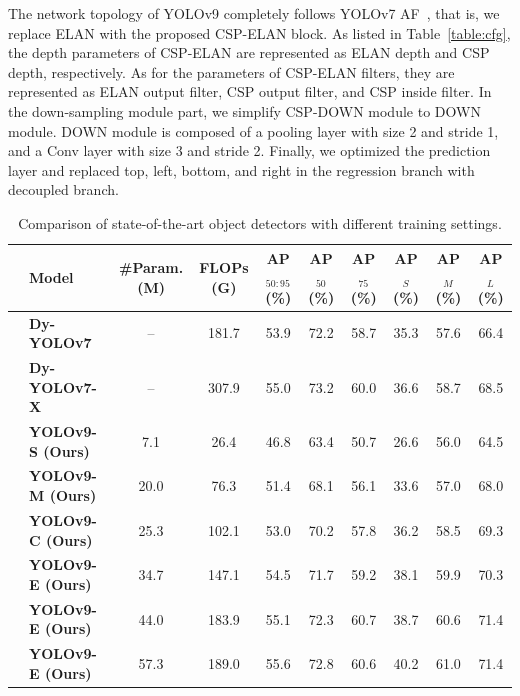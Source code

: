 \documentclass[10pt,twocolumn,letterpaper]{article}
\begin{document}
	The network topology of YOLOv9 completely follows YOLOv7 AF~\cite{wang2023yolov7}, that is, we replace ELAN with the proposed CSP-ELAN block.  As listed in Table~\ref{table:cfg}, the depth parameters of CSP-ELAN are represented as ELAN depth and CSP depth, respectively.  As for the parameters of CSP-ELAN filters, they are represented as ELAN output filter, CSP output filter, and CSP inside filter.  In the down-sampling module part, we simplify CSP-DOWN module to DOWN module.  DOWN module is composed of a pooling layer with size 2 and stride 1, and a Conv layer with size 3 and stride 2.  Finally, we optimized the prediction layer and replaced top, left, bottom, and right in the regression branch with decoupled branch.
	
	\begin{table}[h]
		\centering
		\begin{threeparttable}[t]
			\footnotesize
			\caption{Comparison of state-of-the-art object detectors with different training settings.}
			\label{table:more}
			\setlength\tabcolsep{4.0pt}
			\begin{tabular}{l|lcccccccc}
				\toprule
				& \textbf{Model} & \textbf{\#Param. (M)} & \textbf{FLOPs (G)} & \textbf{AP$_{50:95}$ (\%)} & \textbf{AP$_{50}$ (\%)} & \textbf{AP$_{75}$ (\%)} & \textbf{AP$_{S}$ (\%)} & \textbf{AP$_{M}$ (\%)} & \textbf{AP$_{L}$ (\%)} \\
				\midrule
				\multirow{8}{*}{\rotatebox{90}{\textbf{Train-from-scratch}}} & \textbf{Dy-YOLOv7~\cite{lin2023dynamicdet}} & -- & 181.7 & 53.9 & 72.2 & 58.7 & 35.3 & 57.6 & 66.4 \\
				& \textbf{Dy-YOLOv7-X~\cite{lin2023dynamicdet}} & -- & 307.9 & 55.0 & 73.2 & 60.0 & 36.6 & 58.7 & 68.5 \\
				\cline{2-10}
				& \textbf{YOLOv9-S (Ours)} & 7.1 & 26.4 & 46.8 & 63.4 & 50.7 & 26.6 & 56.0 & 64.5 \\
				& \textbf{YOLOv9-M (Ours)} & 20.0 & 76.3 & 51.4 & 68.1 & 56.1 & 33.6 & 57.0 & 68.0 \\
				& \textbf{YOLOv9-C (Ours)} & 25.3 & 102.1 & 53.0 & 70.2 & 57.8 & 36.2 & 58.5 & 69.3 \\
				& \textbf{YOLOv9-E (Ours)} & 34.7 & 147.1 & 54.5 & 71.7 & 59.2 & 38.1 & 59.9 & 70.3 \\
				& \textbf{YOLOv9-E (Ours)} & 44.0 & 183.9 & 55.1 & 72.3 & 60.7 & 38.7 & 60.6 & 71.4 \\
				& \textbf{YOLOv9-E (Ours)} & 57.3 & 189.0 & 55.6 & 72.8 & 60.6 & 40.2 & 61.0 & 71.4 \\
				\midrule

\end{tabular}
\end{threeparttable}
\end{table}
\end{document}
